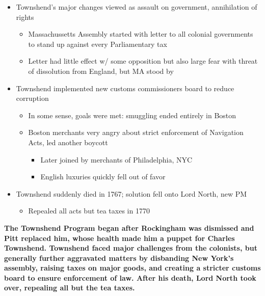 \documentclass[a4paper]{article}
\begin{document}
{\begin{itemize}
\begin{itemize}
\begin{itemize}
\begin{itemize}
                    \item Taxes equally unacceptable to Stamp Act
                \end{itemize}
            \end{itemize}
        \end{itemize}
        \item Townshend's major changes viewed as assault on government, annihilation of rights
        \begin{itemize}
            \item Massachussetts Assembly started with letter to all colonial governments to stand up against every Parliamentary tax 
            \item Letter had little effect w/ some opposition but also large fear with threat of dissolution from England, but MA stood by
        \end{itemize}
        \item Townshend implemented new customs commissioners board to reduce corruption
        \begin{itemize}
            \item In some sense, goals were met: smuggling ended entirely in Boston
            \item Boston merchants very angry about strict enforcement of Navigation Acts, led another boycott
            \begin{itemize}
                \item Later joined by merchants of Philadelphia, NYC
                \item English luxuries quickly fell out of favor
            \end{itemize}
        \end{itemize}
        \item Townshend suddenly died in 1767; solution fell onto Lord North, new PM
        \begin{itemize}
            \item Repealed all acts but tea taxes in 1770
        \end{itemize} 
    \end{itemize}
    \textbf{The Townshend Program began after Rockingham was dismissed and Pitt replaced him, whose health made him a puppet for Charles Townshend. Townshend faced major challenges from the colonists, but generally further aggravated matters by disbanding New York's assembly, raising taxes on major goods, and creating a stricter customs board to ensure enforcement of law. After his death, Lord North took over, repealing all but the tea taxes.}}
\end{document}
